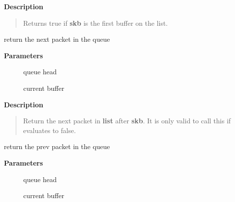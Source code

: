 \documentclass[a4paper,8pt,english]{sphinxmanual}
\begin{document}
\textbf{Description}
\begin{quote}

Returns true if \textbf{skb} is the first buffer on the list.
\end{quote}

\begin{fulllineitems}
\label{networking/kapi:c.skb_queue_next}
return the next packet in the queue

\end{fulllineitems}


\textbf{Parameters}
\begin{description}
\item[{}] \leavevmode
queue head

\item[{}] \leavevmode
current buffer

\end{description}

\textbf{Description}
\begin{quote}

Return the next packet in \textbf{list} after \textbf{skb}.  It is only valid to
call this if {\hyperref[networking/kapi:c.skb_queue_is_last]{\emph{}}} evaluates to false.
\end{quote}

\begin{fulllineitems}
\label{networking/kapi:c.skb_queue_prev}
return the prev packet in the queue

\end{fulllineitems}


\textbf{Parameters}
\begin{description}
\item[{}] \leavevmode
queue head

\item[{}] \leavevmode
current buffer

\end{description}
\end{document}
